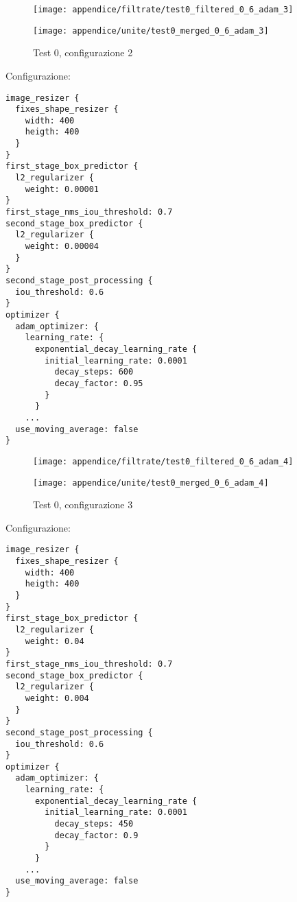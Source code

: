 \newpage
\begin{figure}[H]  
    \begin{minipage}{.5\columnwidth}  
        \centering  
        \texttt{[image: appendice/filtrate/test0\_filtered\_0\_6\_adam\_3]}  
    \end{minipage}%
    \begin{minipage}{0.5\columnwidth}  
        \centering  
        \texttt{[image: appendice/unite/test0\_merged\_0\_6\_adam\_3]}  
    \end{minipage}  
    \caption{Test 0, configurazione 2}
\end{figure}%
Configurazione:
\begin{multicols}{2}
    \begin{lstlisting}
image_resizer {
  fixes_shape_resizer {
    width: 400
    heigth: 400
  }
}
first_stage_box_predictor {
  l2_regularizer {
    weight: 0.00001
}
first_stage_nms_iou_threshold: 0.7
second_stage_box_predictor {
  l2_regularizer {
    weight: 0.00004
  }
}
second_stage_post_processing {
  iou_threshold: 0.6
}
optimizer {
  adam_optimizer: {
    learning_rate: {
      exponential_decay_learning_rate {
        initial_learning_rate: 0.0001
          decay_steps: 600
          decay_factor: 0.95
        }
      }
    ...
  use_moving_average: false
}
    \end{lstlisting}
\end{multicols}

\newpage
\begin{figure}[H]  
    \begin{minipage}{.5\columnwidth}  
        \centering  
        \texttt{[image: appendice/filtrate/test0\_filtered\_0\_6\_adam\_4]}  
    \end{minipage}%
    \begin{minipage}{0.5\columnwidth}  
        \centering  
        \texttt{[image: appendice/unite/test0\_merged\_0\_6\_adam\_4]}  
    \end{minipage}  
    \caption{Test 0, configurazione 3}
\end{figure}%
Configurazione:
\begin{multicols}{2}
    \begin{lstlisting}
image_resizer {
  fixes_shape_resizer {
    width: 400
    heigth: 400
  }
}
first_stage_box_predictor {
  l2_regularizer {
    weight: 0.04
}
first_stage_nms_iou_threshold: 0.7
second_stage_box_predictor {
  l2_regularizer {
    weight: 0.004
  }
}
second_stage_post_processing {
  iou_threshold: 0.6
}
optimizer {
  adam_optimizer: {
    learning_rate: {
      exponential_decay_learning_rate {
        initial_learning_rate: 0.0001
          decay_steps: 450
          decay_factor: 0.9
        }
      }
    ...
  use_moving_average: false
}
    \end{lstlisting}
\end{multicols}

